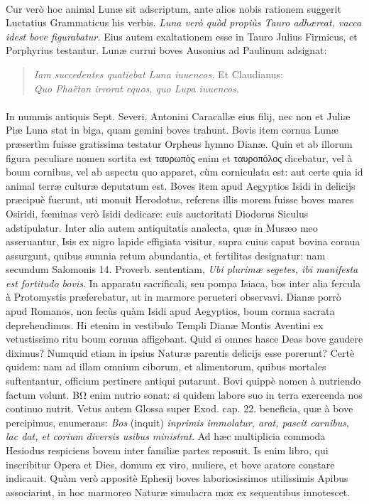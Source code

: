\documentclass[a4paper, 11pt, oneside, polutonikogreek, latin]{article}
\begin{document}
\paragraph{}
Cur verò hoc animal Lunæ sit adscriptum, ante alios nobis rationem suggerit Luctatius Grammaticus his verbis. \emph{Luna verò quòd propiùs Tauro adhæreat, vacca idest bove figurabatur.} Eius autem exaltationem esse in Tauro Julius Firmicus, et Porphyrius testantur. Lunæ currui boves Ausonius ad Paulinum adsignat:
\begin{quote}
\emph{Iam succedentes quatiebat Luna iuuencos.} Et Claudianus:\\
\emph{Quo Phaëton irrorat equos, quo Lupa iuuencos.}\\
\end{quote}
\paragraph{}
In nummis antiquis Sept. Severi, Antonini Caracallæ eius filij, nec non et Juliæ Piæ Luna stat in biga, quam gemini boves trahunt. Bovis item cornua Lunæ præsertìm fuisse gratissima testatur Orpheus hymno Dianæ. Quin et ab illorum figura peculiare nomen sortita est ταυρωπὸς enim et ταυροπὸλος dicebatur, vel à boum cornibus, vel ab aspectu quo apparet, cùm corniculata est: aut certe quia id animal terræ culturæ deputatum est. Boves item apud Aegyptios Isidi in delicijs præcipuè fuerunt, uti monuit Herodotus, referens illis morem fuisse boves mares Osiridi, fœminas verò Isidi dedicare: cuis auctoritati Diodorus Siculus adstipulatur. Inter alia autem antiquitatis analecta, quæ in Musæo meo asseruantur, Isis ex nigro lapide effigiata visitur, supra cuius caput bovina cornua assurgunt, quibus sumnia retum abundantia, et fertilitas designatur: nam secundum Salomonis 14. Proverb. sententiam, \emph{Ubi plurimæ segetes, ibi manifesta est fortitudo bovis}. In apparatu sacrificali, seu pompa Isiaca, bos inter alia fercula à Protomystis præferebatur, ut in marmore perueteri observavi. Dianæ porrò apud Romanos, non fecùs quàm Isidi apud Aegyptios, boum cornua sacrata deprehendimus. Hi etenim in vestibulo Templi Dianæ Montis Aventini ex vetustissimo ritu boum cornua affigebant. Quid si omnes hasce Deas bove gaudere diximus? Numquid etiam in ipsius Naturæ parentis delicijs esse porerunt? Certè quidem: nam ad illam omnium ciborum, et alimentorum, quibus mortales suftentantur, officium pertinere antiqui putarunt. Bovi quippè nomen à nutriendo factum volunt. BΩ enim nutrio sonat: si quidem labore suo in terra exercenda nos continuo nutrit. Vetus autem Glossa super Exod. cap. 22. beneficia, quæ à bove percipimus, enumerans: \emph{Bos} (inquit) \emph{inprimis immolatur, arat, pascit carnibus, lac dat, et corium diversis usibus ministrat}. Ad hæc multiplicia commoda Hesiodus respiciens bovem inter familiæ partes reposuit. Is enim libro, qui inscribitur Opera et Dies, domum ex viro, muliere, et bove aratore constare indicauit. Quàm verò appositè Ephesij boves laboriosissimos utilissimis Apibus associarint, in hoc marmoreo Naturæ simulacra mox ex sequentibus innotescet.
\clearpage
\end{document}
